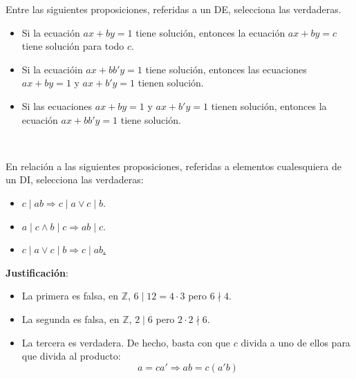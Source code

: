 \begin{ejercicio}
    Entre las siguientes proposiciones, referidas a un DE, selecciona las verdaderas.
    \begin{itemize}
        \item Si la ecuación $ax+by=1$ tiene solución, entonces la ecuación $ax+by=c$ tiene solución para todo $c$.
        \item Si la ecuacióin $ax+bb'y=1$ tiene solución, entonces las ecuaciones $ax+by=1$ y $ax+b'y=1$ tienen solución. 
        \item Si las ecuaciones $ax+by=1$ y $ax+b'y=1$ tienen solución, entonces la ecuación $ax+bb'y=1$ tiene solución.
    \end{itemize}
\end{ejercicio}

\newpage
\ %
\resetearcontador

\begin{ejercicio}
    En relación a las siguientes proposiciones, referidas a elementos cualesquiera de un DI, selecciona las verdaderas:
    \begin{itemize}
        \item $c\mid ab \Longrightarrow c\mid a \lor c\mid b$.
        \item $a\mid c \land b\mid c \Longrightarrow ab\mid c$. 
        \item \underline{$c\mid a \lor c\mid b \Longrightarrow c\mid ab$.}
    \end{itemize}

    \noindent
    \textbf{Justificación}:
    \begin{itemize}
        \item La primera es falsa, en $\mathbb{Z}$, $6\mid 12 = 4 \cdot 3$ pero $6\nmid 4$.
        \item La segunda es falsa, en $\mathbb{Z}$, $2\mid 6$ pero $2 \cdot 2 \nmid 6$.
        \item La tercera es verdadera. De hecho, basta con que $c$ divida a uno de ellos para que divida al producto:
            \begin{equation*}
                a = ca' \Longrightarrow ab=c(a'b)
            \end{equation*}
    \end{itemize}
\end{ejercicio}


